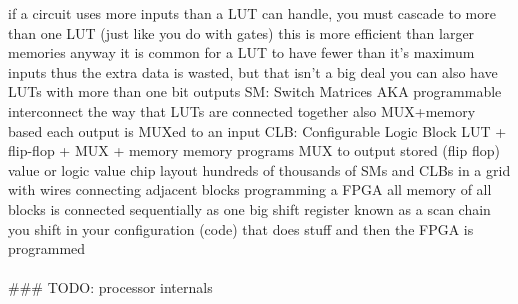 \documentclass{article}
\begin{document}
\begin{multicols*}{2}
\begin{outline}[compactitem]
\2         if a circuit uses more inputs than a LUT can handle, you must cascade to more than one LUT
\3             (just like you do with gates)
\3             this is more efficient than larger memories anyway
\2         it is common for a LUT to have fewer than it's maximum inputs
\3             thus the extra data is wasted, but that isn't a big deal
\2         you can also have LUTs with more than one bit outputs
\1     SM: Switch Matrices
\2         AKA programmable interconnect
\2         the way that LUTs are connected together
\2         also MUX+memory based
\2         each output is MUXed to an input
\1     CLB: Configurable Logic Block
\2         LUT + flip-flop + MUX + memory
\2         memory programs MUX to output stored (flip flop) value or logic value
\1     chip layout
\2         hundreds of  thousands of SMs and CLBs in a grid with wires connecting adjacent blocks
\0 programming a FPGA
\1     all memory of all blocks is connected sequentially as one big shift register
\2         known as a scan chain
\1     you shift in your configuration (code) that does stuff and then the FPGA is programmed
\noindent \\ 
\noindent \\ 
\0 \#\#\# TODO: processor internals
\end{outline}
\end{multicols*}
\end{document}
